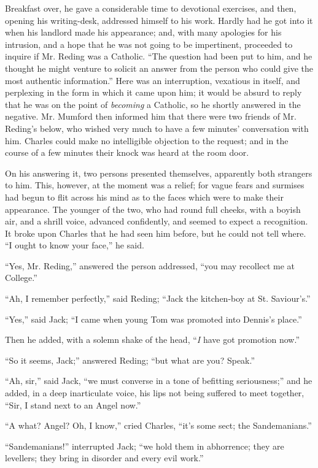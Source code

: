 Breakfast over, he gave a considerable time to devotional
exercises, and then, opening his writing-desk, addressed himself to
his work. Hardly had he got into it when his landlord made his
appearance; and, with many apologies for his intrusion, and a hope
that he was not going to be impertinent, proceeded to inquire if Mr.
Reding was a Catholic. ``The question had been put to him, and he
thought he might venture to solicit an answer from the person who
could give the most authentic information.'' Here was an
interruption, vexatious in itself, and perplexing in the form in which
it came upon him; it would be absurd to reply that he was on the
point of \emph{becoming} a Catholic, so he shortly answered in the
negative. Mr. Mumford then informed him that there were two friends of
Mr. Reding's below, who wished very much to have a few minutes'
conversation with him. Charles could make no intelligible objection to
the request; and in the course of a few minutes their knock was heard
at the room door.

On his answering it, two persons presented themselves, apparently
both strangers to him. This, however, at the moment was a relief; for
vague fears and surmises had begun to flit across his mind as to the
faces which were to make their appearance. The younger of the two, who
had round full cheeks, with a boyish air, and a shrill voice, advanced
confidently, and seemed to expect a recognition. It broke upon Charles
that he had seen him before, but he could not tell where. ``I
ought to know your face,'' he said.

``Yes, Mr. Reding,'' answered the person addressed,
``you may recollect me at College.''

``Ah, I remember perfectly,'' said Reding; ``Jack the
kitchen-boy at St. Saviour's.''

``Yes,'' said Jack; ``I came when young Tom was
promoted into Dennis's place.''

Then he added, with a solemn shake of the head, ``\emph{I} have
got promotion now.''

``So it seems, Jack;'' answered Reding; ``but what are
you? Speak.''

``Ah, sir,'' said Jack, ``we must converse in a tone of
befitting seriousness;'' and he added, in a deep inarticulate
voice, his lips not being suffered to meet together, ``Sir, I
stand next to an Angel now.''

``A what? Angel? Oh, I know,'' cried Charles, ``it's
some sect; the Sandemanians.''

``Sandemanians!'' interrupted Jack; ``we hold them in
abhorrence; they are levellers; they bring in disorder and every evil
work.''

